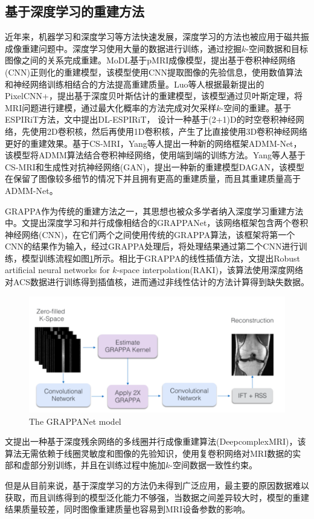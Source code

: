\documentclass[UTF8]{article}
\begin{document}
\subsection{基于深度学习的重建方法}
\par 近年来，机器学习和深度学习等方法快速发展，深度学习的方法也被应用于磁共振成像重建问题中。深度学习使用大量的数据进行训练，通过挖掘$k$-空间数据和目标图像之间的关系完成重建。MoDL\cite{aggarwal2018modl}基于pMRI成像模型，提出基于卷积神经网络(CNN)正则化的重建模型，该模型使用CNN提取图像的先验信息，使用数值算法和神经网络训练相结合的方法提高重建质量。Luo等人根据最新提出的PixelCNN+\cite{salimans2017pixelcnn++}，提出基于深度贝叶斯估计的重建模型\cite{luo2020mri}，该模型通过贝叶斯定理，将MRI问题进行建模，通过最大化概率的方法完成对欠采样$k$-空间的重建。基于ESPIRiT方法，文\cite{sandino2021accelerating}中提出DL-ESPIRiT， 设计一种基于(2+1)D的时空卷积神经网络，先使用2D卷积核，然后再使用1D卷积核，产生了比直接使用3D卷积神经网络更好的重建效果。基于CS-MRI，Yang等人提出一种新的网络框架ADMM-Net\cite{yang2016deep}，该模型将ADMM算法结合卷积神经网络，使用端到端的训练方法。Yang等人基于CS-MRI和生成性对抗神经网络(GAN)，提出一种新的重建模型DAGAN\cite{yang2017dagan}，该模型在保留了图像较多细节的情况下并且拥有更高的重建质量，而且其重建质量高于ADMM-Net。
\par GRAPPA作为传统的重建方法之一，其思想也被众多学者纳入深度学习重建方法中。文\cite{9157643}提出深度学习和并行成像相结合的GRAPPANet，该网络框架包含两个卷积神经网络(CNN)，在它们两个之间使用传统的GRAPPA算法，该框架将第一个CNN的结果作为输入，经过GRAPPA处理后，将处理结果通过第二个CNN进行训练，模型训练流程如图\ref{GRAPPANet}所示。相比于GRAPPA的线性插值方法，文\cite{Mehmet2019Scan}提出Robust artificial neural networks for $k$-space interpolation(RAKI)，该算法使用深度网络对ACS数据进行训练得到插值核，进而通过非线性估计的方法计算得到缺失数据。
\begin{figure}[ht]
	\centering
	\includegraphics[scale=1]{./image/GRAPPANet.png}
	\caption{The GRAPPANet model}
	\label{GRAPPANet}
\end{figure}
文\cite{WANG2020136}提出一种基于深度残余网络的多线圈并行成像重建算法(DeepcomplexMRI)，该算法无需依赖于线圈灵敏度和图像的先验知识，使用复卷积网络对MRI数据的实部和虚部分别训练，并且在训练过程中施加$k$-空间数据一致性约束。


\par 但是从目前来说，基于深度学习的方法仍未得到广泛应用，最主要的原因数据难以获取，而且训练得到的模型泛化能力不够强，当数据之间差异较大时，模型的重建结果质量较差，同时图像重建质量也容易到MRI设备参数的影响。


\newpage


\end{document}
